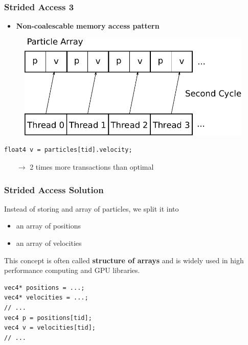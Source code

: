 \documentclass[aspectratio=169,handout]{beamer}
\begin{document}
\begin{frame}[fragile]
	\frametitle{Strided Access 3}
	\begin{itemize}
		\item 	\textbf{Non-coalescable memory access pattern}
	\end{itemize}

	\begin{figure}
		\centering
		\includegraphics[height=0.5\textheight]{accessParticle2}
	\end{figure}
\begin{lstlisting}             
float4 v = particles[tid].velocity;
\end{lstlisting} 
\begin{itemize}
	\item[$\rightarrow$] 2 times more transactions than optimal
	\end{itemize}
\end{frame}

\begin{frame}[fragile]
\frametitle{Strided Access Solution}
Instead of storing and array of particles, we split it into
\begin{itemize}
	\item an array of positions
	\item an array of velocities
\end{itemize}
This concept is often called \textbf{structure of arrays} and is widely used in high performance computing and GPU libraries.
\begin{lstlisting}
vec4* positions = ...;
vec4* velocities = ...;
// ...
vec4 p = positions[tid];
vec4 v = velocities[tid];
// ...
\end{lstlisting}
\end{frame}
\end{document}
